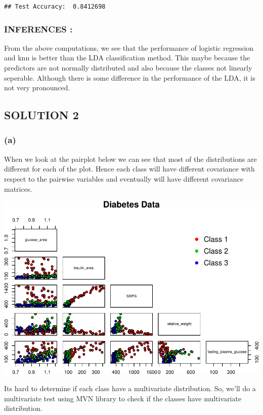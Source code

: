 \documentclass[]{article}
\begin{document}
\begin{verbatim}
## Test Accuracy:  0.8412698
\end{verbatim}

\subsubsection{INFERENCES :}\label{inferences}

From the above computations, we see that the performance of logistic
regression and knn is better than the LDA classification method. This
maybe because the predictors are not normally distributed and also
because the classes not linearly seperable. Although there is some
difference in the performance of the LDA, it is not very pronounced.
\newpage

\subsection{SOLUTION 2}\label{solution-2}

\subsubsection{(a)}\label{a}

When we look at the pairplot below we can see that most of the
distributions are different for each of the plot. Hence each class will
have different covariance with respect to the pairwise variables and
eventually will have different covariance matrices. \newline

\includegraphics{HW3_files/figure-latex/unnamed-chunk-11-1.pdf}

Its hard to determine if each class have a multivariate distribution.
So, we'll do a multivariate test using MVN library to check if the
classes have multivariate distribution.
\end{document}
